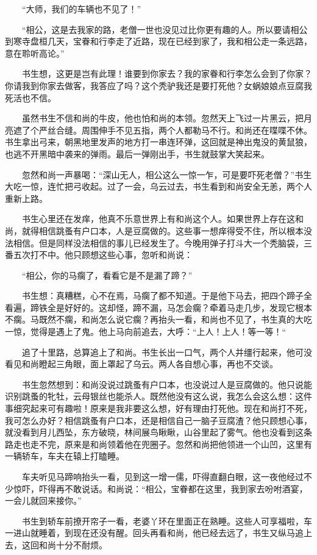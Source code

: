 　　“大师，我们的车辆也不见了！” 

　　“相公，这是去我家的路，老僧一世也没见过比你更有趣的人。所以要请相公到寒寺盘桓几天，宝眷和行李走了近路，现在已经到家了，我和相公走一条远路，意在聆听高论。” 

　　书生想，这更是岂有此理！谁要到你家去？我的家眷和行李怎么会到了你家？你请我到你家去做客，我答应了吗？这个秃驴我还是要打死他？女蜗娘娘点豆腐我死活也不信。 

　　虽然书生不信和尚的牛皮，他也怕和尚的本领。忽然天上飞过一片黑云，把月亮遮了个严丝合缝。周围伸手不见五指，两个人都勒马不行。和尚还在喋喋不休。书生拿出弓来，朝黑地里发声的地方打一串连环弹，这回就是神出鬼没的黄鼠狼，也逃不开黑暗中袭来的弹雨。最后一弹刚出手，书生就鼓掌大笑起来。 

　　忽然和尚一声暴喝：“深山无人，相公这么一惊一乍，可是要吓死老僧？”书生大吃一惊，连忙把弓收起。过了一会，乌云过去，书生看到和尚安全无恙，两个人重新上路。 

　　书生心里还在发痒，他真不乐意世界上有和尚这个人。如果世界上存在这和尚，就得相信跳蚤有户口本，人是豆腐做的。这些事一想痒得受不住，所以根本没法相信。但是同样没法相信的事儿已经发生了。今晚用弹子打斗大一个秃脑袋，三番五次打不中。他只顾想这些心事，忽听和尚说： 

　　“相公，你的马瘸了，看看它是不是漏了蹄？” 

　　书生想：真糟糕，心不在焉，马瘸了都不知道。于是他下马去，把四个蹄子全看遍，蹄铁全是好好的。这却怪，蹄不漏，马怎会瘸？牵着马走几步，发现它根本不瘸。马既然不瘸，和尚怎么说它瘸？再抬头一看，和尚也不见了，书生真的大吃一惊，觉得是遇上了鬼。他上马向前追去，大呼：“上人！上人！等一等！“

　　追了十里路，总算追上了和尚。书生长出一口气，两个人并缰行起来，他可没看见和尚瞪起三角眼，面上罩起了乌云。两人各自想心事，再也不交谈。 

　　书生忽然想到：和尚没说过跳蚤有户口本，也没说过人是豆腐做的。他只说能识别跳蚤的牝牡，云母银丝也能杀人。既然他没有这么说，我怎么会这么想：这件事细究起来可有趣啦！原来是我非要这么想，好有理由打死他。现在和尚打不死，我可怎么办好？相信跳蚤有户口本，还是相信自己一脑子豆腐渣？他只顾想心事，就没看到月儿西坠，东方破晓，林间展鸟瞅瞅，山谷里起了雾气。他也没看到这条路走也走不完，原来是和尚领着他在兜圈子。忽然和尚把他领进一个山凹，这里有一辆轿车，车夫在辕上打瞌睡。 

　　车夫听见马蹄响抬头一看，见到这一增一儒，吓得直翻白眼，这一夜他经过不少惊吓，吓得再不敢说话。和尚说：“相公，宝眷都在这里，我到家去吩咐酒宴，一会儿就回来接你。” 

　　书生到轿车前撩开帘子一看，老婆丫环在里面正在熟睡。这些人可享福啦，车一进山就睡着，到现在还没有醒。回头再看和尚，他已经去远了，书生又纵马追上去，这回和尚十分不耐烦。 

